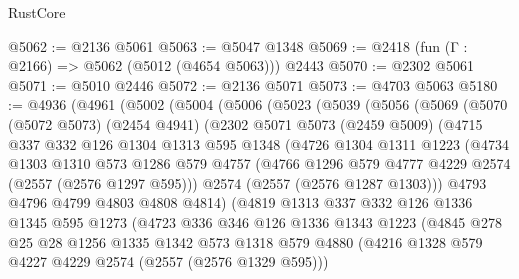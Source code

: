\begin{lexlean}{RustCore}
\begin{coremodule}
@5062 := @2136 @5061
@5063 := @5047 @1348
@5069 := @2418 (fun (Γ : @2166) => @5062 (@5012 (@4654 @5063))) @2443
@5070 := @2302 @5061
@5071 := @5010 @2446
@5072 := @2136 @5071
@5073 := @4703 @5063
@5180 := @4936
    (@4961
      (@5002
        (@5004
          (@5006
            (@5023
              (@5039
                (@5056
                  (@5069
                    (@5070
                      (@5072 @5073)
                      (@2454 @4941)
                      (@2302
                        @5071
                        @5073
                        (@2459 @5009)
                        (@4715
                          @337
                          @332
                          @126
                          @1304
                          @1313
                          @595
                          @1348
                          (@4726
                            @1304
                            @1311
                            @1223
                            (@4734
                              @1303
                              @1310
                              @573
                              @1286
                              @579
                              @4757
                              (@4766 @1296 @579 @4777 @4229 @2574 (@2557 (@2576 @1297 @595)))
                              @2574
                              (@2557 (@2576 @1287 @1303)))
                            @4793
                            @4796
                            @4799
                            @4803
                            @4808
                            @4814)
                          (@4819
                            @1313
                            @337
                            @332
                            @126
                            @1336
                            @1345
                            @595
                            @1273
                            (@4723
                              @336
                              @346
                              @126
                              @1336
                              @1343
                              @1223
                              (@4845
                                @278
                                @25
                                @28
                                @1256
                                @1335
                                @1342
                                @573
                                @1318
                                @579
                                @4880
                                (@4216 @1328 @579 @4227 @4229 @2574 (@2557 (@2576 @1329 @595)))

\end{coremodule}
\end{lexlean}
